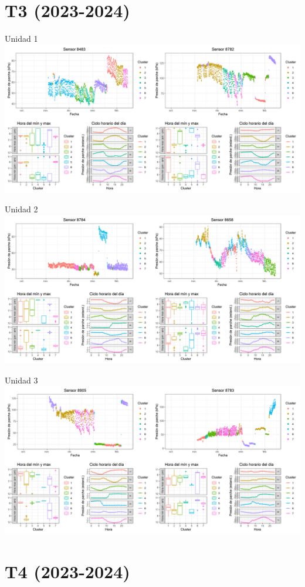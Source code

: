 \documentclass[
  letterpaper,
  DIV=11,
  numbers=noendperiod]{scrreprt}
\begin{document}
\chapter{T3 (2023-2024)}

Unidad 1
\includegraphics{figuras/01_turgor_sensor/2023_2024_Rio_Claro_T3_Unidad_1.png}

Unidad 2
\includegraphics{figuras/01_turgor_sensor/2023_2024_Rio_Claro_T3_Unidad_2.png}

Unidad 3
\includegraphics{figuras/01_turgor_sensor/2023_2024_Rio_Claro_T3_Unidad_3.png}

\chapter{T4 (2023-2024)}
\end{document}
